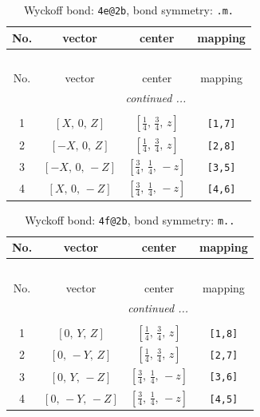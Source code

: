 \documentclass[fleqn,8pt]{jsarticle}
\begin{document}
\renewcommand{\arraystretch}{1.2}
\begin{longtable}{cccc}
\caption{Wyckoff bond: {\tt 4e@2b}, bond symmetry: {\tt .m.}}
 \\
 \hline \hline
No. & vector & center & mapping \\ \hline \endfirsthead

\multicolumn{3}{l}{\tablename\ \thetable{}} \\
 \hline \hline
No. & vector & center & mapping \\ \hline \endhead

 \hline \hline
\multicolumn{3}{r}{\footnotesize\it continued ...} \\ \endfoot

 \hline \hline
\multicolumn{3}{r}{} \\ \endlastfoot

1 & $\left[ X,\, 0,\, Z \right]$ & $\left[ \frac{1}{4},\, \frac{3}{4},\, z \right]$ & {\tt [1,7]} \\ \hline
2 & $\left[ - X,\, 0,\, Z \right]$ & $\left[ \frac{1}{4},\, \frac{3}{4},\, z \right]$ & {\tt [2,8]} \\ \hline
3 & $\left[ - X,\, 0,\, - Z \right]$ & $\left[ \frac{3}{4},\, \frac{1}{4},\, - z \right]$ & {\tt [3,5]} \\ \hline
4 & $\left[ X,\, 0,\, - Z \right]$ & $\left[ \frac{3}{4},\, \frac{1}{4},\, - z \right]$ & {\tt [4,6]} \\
\end{longtable}
\renewcommand{\arraystretch}{1.2}
\begin{longtable}{cccc}
\caption{Wyckoff bond: {\tt 4f@2b}, bond symmetry: {\tt m..}}
 \\
 \hline \hline
No. & vector & center & mapping \\ \hline \endfirsthead

\multicolumn{3}{l}{\tablename\ \thetable{}} \\
 \hline \hline
No. & vector & center & mapping \\ \hline \endhead

 \hline \hline
\multicolumn{3}{r}{\footnotesize\it continued ...} \\ \endfoot

 \hline \hline
\multicolumn{3}{r}{} \\ \endlastfoot

1 & $\left[ 0,\, Y,\, Z \right]$ & $\left[ \frac{1}{4},\, \frac{3}{4},\, z \right]$ & {\tt [1,8]} \\ \hline
2 & $\left[ 0,\, - Y,\, Z \right]$ & $\left[ \frac{1}{4},\, \frac{3}{4},\, z \right]$ & {\tt [2,7]} \\ \hline
3 & $\left[ 0,\, Y,\, - Z \right]$ & $\left[ \frac{3}{4},\, \frac{1}{4},\, - z \right]$ & {\tt [3,6]} \\ \hline
4 & $\left[ 0,\, - Y,\, - Z \right]$ & $\left[ \frac{3}{4},\, \frac{1}{4},\, - z \right]$ & {\tt [4,5]} \\
\end{longtable}
\end{document}
